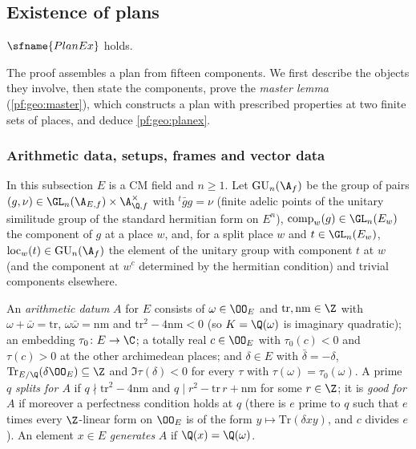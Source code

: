 \subsection{Existence of plans}\label{sec:pf:geo:plans}

\begin{theorem}\label{pf:geo:planex}
$\sfname{PlanEx}$ holds.
\end{theorem}

The proof assembles a plan from fifteen components. We first describe the objects they involve,
then state the components, prove the \emph{master lemma} (\cref{pf:geo:master}), which constructs a plan
with prescribed properties at two finite sets of places, and deduce \cref{pf:geo:planex}.

\subsubsection{Arithmetic data, setups, frames and vector data}

In this subsection $E$ is a CM field and $n\ge1$. Let $\geoGU_n(\A_f)$ be the group of pairs
$(g,\nu)\in\GL_n(\A_{E,f})\times\A_{\Q,f}^\times$ with ${}^t\bar gg=\nu$ (finite adelic points of the unitary
similitude group of the standard hermitian form on $E^n$), $\mathrm{comp}_w(g)\in\GL_n(E_w)$ the component of $g$ at a
place $w$, and, for a split place $w$ and $t\in\GL_n(E_w)$, $\mathrm{loc}_w(t)\in\geoGU_n(\A_f)$ the element of the unitary
group with component $t$ at $w$ (and the component at $w^c$ determined by the hermitian condition) and trivial
components elsewhere.

\begin{definition}\label{pf:geo:arith}
An \emph{arithmetic datum} $A$ for $E$ consists of $\omega\in\OO_E$ and $\mathrm{tr},\mathrm{nm}\in\Z$ with
$\omega+\bar\omega=\mathrm{tr}$, $\omega\bar\omega=\mathrm{nm}$ and $\mathrm{tr}^2-4\mathrm{nm}<0$ (so $K=\Q(\omega)$ is imaginary quadratic); an
embedding $\tau_0\colon E\to\C$; a totally real $c\in\OO_E$ with $\tau_0(c)<0$ and $\tau(c)>0$ at the other archimedean
places; and $\delta\in E$ with $\bar\delta=-\delta$, $\mathrm{Tr}_{E/\Q}(\delta\OO_E)\subseteq\Z$ and $\Im\tau(\delta)<0$ for every $\tau$ with
$\tau(\omega)=\tau_0(\omega)$. A prime $q$ \emph{splits for $A$} if $q\nmid\mathrm{tr}^2-4\mathrm{nm}$ and $q\mid r^2-\mathrm{tr}\,r+\mathrm{nm}$ for some
$r\in\Z$; it is \emph{good for $A$} if moreover a perfectness condition holds at $q$ (there is $e$ prime to $q$ such
that $e$ times every $\Z$-linear form on $\OO_E$ is of the form $y\mapsto\mathrm{Tr}(\delta xy)$, and $c$ divides $e$). An element
$x\in E$ \emph{generates} $A$ if $\Q(x)=\Q(\omega)$.
\end{definition}

